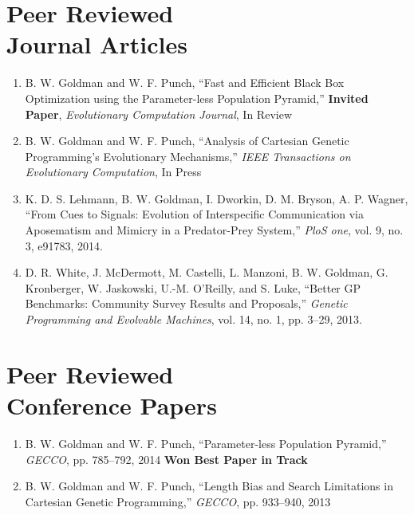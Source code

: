 \documentclass[margin,line]{resume}
\begin{document}
\begin{resume}
    \section{\mysidestyle Peer Reviewed\\Journal Articles}

    \begin{enumerate}
    \item
    B. W. Goldman and W. F. Punch,
    ``Fast and Efficient Black Box Optimization using the Parameter-less Population Pyramid,''
    \textbf{Invited Paper}, \textsl{Evolutionary Computation Journal}, In Review

    \item
    B. W. Goldman and W. F. Punch,
    ``Analysis of Cartesian Genetic Programming's Evolutionary Mechanisms,''
    \textsl{IEEE Transactions on Evolutionary Computation}, In Press

    \item
    K. D. S. Lehmann,  B. W. Goldman, I. Dworkin, D. M. Bryson, A. P. Wagner,
    ``From Cues to Signals: Evolution of Interspecific Communication via Aposematism and Mimicry in a Predator-Prey System,''
    \textsl{PloS one}, vol. 9, no. 3, e91783, 2014.    

    \item
    D. R. White, J. McDermott, M. Castelli, L. Manzoni, B. W. Goldman,
    G. Kronberger, W. Jaskowski, U.-M. O’Reilly, and S. Luke,
    ``Better GP Benchmarks: Community Survey Results and Proposals,''
    \textsl{Genetic Programming and Evolvable Machines}, vol. 14, no. 1, pp. 3--29, 2013.    
    \end{enumerate}

    \section{\mysidestyle Peer Reviewed\\Conference Papers}
    \begin{enumerate}
    
    \item
    B. W. Goldman and W. F. Punch,
    ``Parameter-less Population Pyramid,''
    \textsl{GECCO}, pp. 785--792, 2014
    \textbf{Won Best Paper in Track}
        
    \item
    B. W. Goldman and W. F. Punch,
    ``Length Bias and Search Limitations in Cartesian Genetic Programming,''
    \textsl{GECCO}, pp. 933--940, 2013


\end{enumerate}
\end{resume}
\end{document}
